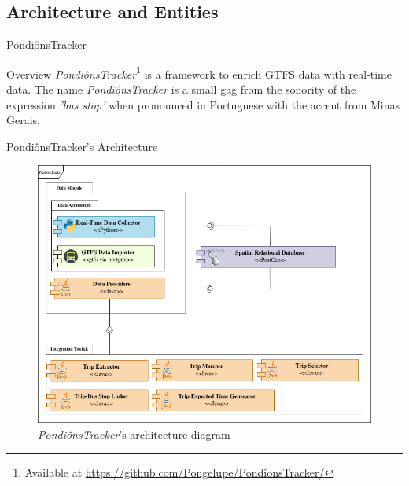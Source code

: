 \documentclass[xcolor=dvipsnames,table]{beamer}
\begin{document}
\subsection{Architecture and Entities}
\begin{frame}{PondiônsTracker}
        \begin{block}{Overview}
                \textit{PondiônsTracker}\footnote{Available at \url{https://github.com/Pongelupe/PondionsTracker/}} 
                is a framework to enrich
                GTFS data with real-time data. 
                The name \textit{PondiônsTracker} is a small gag from the sonority of the expression{ \em 'bus stop'}
                when pronounced in Portuguese with the accent from Minas Gerais.
        \end{block}
\end{frame}
\begin{frame}{PondiônsTracker's Architecture}
        \begin{figure}[H]
                \centering
                \includegraphics[scale=0.3]{images/arq-pondionstracker.drawio.png}
                \caption{\textit{PondiônsTracker}'s architecture diagram}
        \end{figure}
\end{frame}
\end{document}
